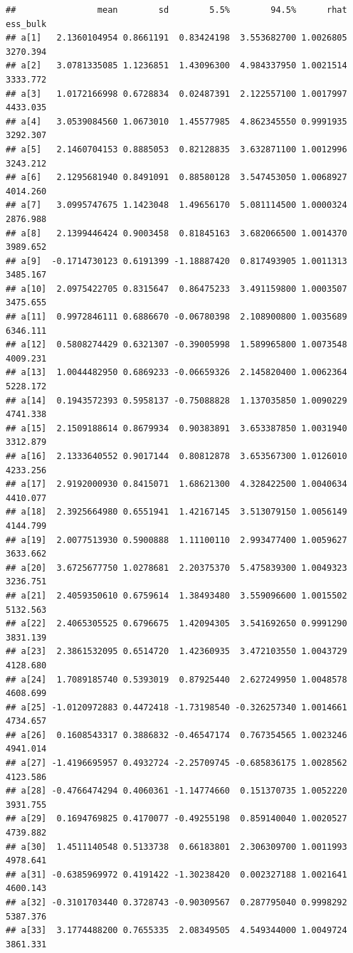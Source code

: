 \documentclass[
]{book}
\begin{document}
\begin{verbatim}
##                mean        sd        5.5%        94.5%      rhat ess_bulk
## a[1]   2.1360104954 0.8661191  0.83424198  3.553682700 1.0026805 3270.394
## a[2]   3.0781335085 1.1236851  1.43096300  4.984337950 1.0021514 3333.772
## a[3]   1.0172166998 0.6728834  0.02487391  2.122557100 1.0017997 4433.035
## a[4]   3.0539084560 1.0673010  1.45577985  4.862345550 0.9991935 3292.307
## a[5]   2.1460704153 0.8885053  0.82128835  3.632871100 1.0012996 3243.212
## a[6]   2.1295681940 0.8491091  0.88580128  3.547453050 1.0068927 4014.260
## a[7]   3.0995747675 1.1423048  1.49656170  5.081114500 1.0000324 2876.988
## a[8]   2.1399446424 0.9003458  0.81845163  3.682066500 1.0014370 3989.652
## a[9]  -0.1714730123 0.6191399 -1.18887420  0.817493905 1.0011313 3485.167
## a[10]  2.0975422705 0.8315647  0.86475233  3.491159800 1.0003507 3475.655
## a[11]  0.9972846111 0.6886670 -0.06780398  2.108900800 1.0035689 6346.111
## a[12]  0.5808274429 0.6321307 -0.39005998  1.589965800 1.0073548 4009.231
## a[13]  1.0044482950 0.6869233 -0.06659326  2.145820400 1.0062364 5228.172
## a[14]  0.1943572393 0.5958137 -0.75088828  1.137035850 1.0090229 4741.338
## a[15]  2.1509188614 0.8679934  0.90383891  3.653387850 1.0031940 3312.879
## a[16]  2.1333640552 0.9017144  0.80812878  3.653567300 1.0126010 4233.256
## a[17]  2.9192000930 0.8415071  1.68621300  4.328422500 1.0040634 4410.077
## a[18]  2.3925664980 0.6551941  1.42167145  3.513079150 1.0056149 4144.799
## a[19]  2.0077513930 0.5900888  1.11100110  2.993477400 1.0059627 3633.662
## a[20]  3.6725677750 1.0278681  2.20375370  5.475839300 1.0049323 3236.751
## a[21]  2.4059350610 0.6759614  1.38493480  3.559096600 1.0015502 5132.563
## a[22]  2.4065305525 0.6796675  1.42094305  3.541692650 0.9991290 3831.139
## a[23]  2.3861532095 0.6514720  1.42360935  3.472103550 1.0043729 4128.680
## a[24]  1.7089185740 0.5393019  0.87925440  2.627249950 1.0048578 4608.699
## a[25] -1.0120972883 0.4472418 -1.73198540 -0.326257340 1.0014661 4734.657
## a[26]  0.1608543317 0.3886832 -0.46547174  0.767354565 1.0023246 4941.014
## a[27] -1.4196695957 0.4932724 -2.25709745 -0.685836175 1.0028562 4123.586
## a[28] -0.4766474294 0.4060361 -1.14774660  0.151370735 1.0052220 3931.755
## a[29]  0.1694769825 0.4170077 -0.49255198  0.859140040 1.0020527 4739.882
## a[30]  1.4511140548 0.5133738  0.66183801  2.306309700 1.0011993 4978.641
## a[31] -0.6385969972 0.4191422 -1.30238420  0.002327188 1.0021641 4600.143
## a[32] -0.3101703440 0.3728743 -0.90309567  0.287795040 0.9998292 5387.376
## a[33]  3.1774488200 0.7655335  2.08349505  4.549344000 1.0049724 3861.331

\end{verbatim}
\end{document}
